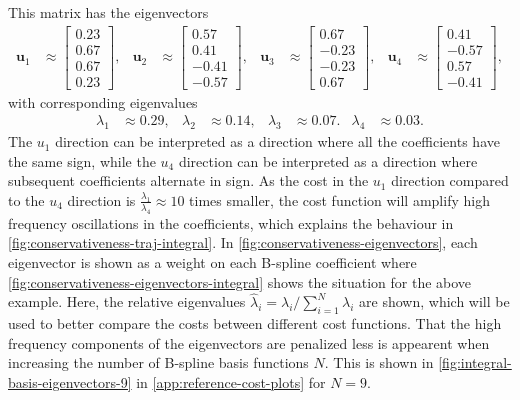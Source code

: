 This matrix has the eigenvectors 
\begin{equation}
    \begin{aligned}
        \mathbf u_1 &\approx \begin{bmatrix}  
            0.23 \\  0.67 \\  0.67 \\  0.23 
        \end{bmatrix}, &
        \mathbf u_2 &\approx \begin{bmatrix}         
            0.57 \\  0.41 \\ -0.41 \\  -0.57 
        \end{bmatrix}, &
        \mathbf u_3 &\approx \begin{bmatrix}         
            0.67 \\  -0.23 \\  -0.23 \\  0.67 
        \end{bmatrix}, &
        \mathbf u_4 &\approx \begin{bmatrix}         
            0.41 \\  -0.57 \\  0.57 \\  -0.41 
        \end{bmatrix},
    \end{aligned}
\end{equation}
with corresponding eigenvalues
\begin{equation}
    \begin{aligned}
        \lambda_1 &\approx 0.29, &
        \lambda_2 &\approx 0.14, &
        \lambda_3 &\approx 0.07. &
        \lambda_4 &\approx 0.03.
    \end{aligned}
\end{equation}
The $u_1$ direction can be interpreted as a direction where all the coefficients have the same sign, while the $u_4$ direction can be interpreted as a direction where subsequent coefficients alternate in sign. 
As the cost in the $u_1$ direction compared to the $u_4$ direction is $\frac{\lambda_1}{\lambda_4} \approx 10$ times smaller, the cost function will amplify high frequency oscillations in the coefficients, which explains the behaviour in \cref{fig:conservativeness-traj-integral}. In \cref{fig:conservativeness-eigenvectors}, each eigenvector is shown as a weight on each B-spline coefficient where \cref{fig:conservativeness-eigenvectors-integral} shows the situation for the above example. Here, the relative eigenvalues $\hat\lambda_i = \lambda_i/\sum_{i=1}^{N} \lambda_i$ are shown, which will be used to better compare the costs between different cost functions. That the high frequency components of the eigenvectors are penalized less is appearent when increasing the number of B-spline basis functions $N$. This is shown in \cref{fig:integral-basis-eigenvectors-9} in \cref{app:reference-cost-plots} for $N=9$.
